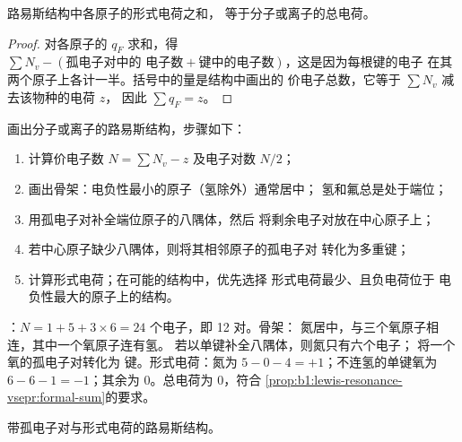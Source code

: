\begin{proposition}[形式电荷之和等于总电荷]\label{prop:b1:lewis-resonance-vsepr:formal-sum}
路易斯结构中各原子的形式电荷之和，
等于分子或离子的总电荷。
\end{proposition}

\begin{proof}
对各原子的 $q_F$ 求和，得 $\sum N_v - (\text{孤电子对中的
电子数} + \text{键中的电子数})$，这是因为每根键的电子
在其两个原子上各计一半。括号中的量是结构中画出的
价电子总数，它等于 $\sum N_v$ 减去该物种的电荷 $z$，
因此 $\sum q_F = z$。
\end{proof}

\begin{method}[画路易斯结构]\label{met:b1:lewis-resonance-vsepr:lewis}
画出分子或离子的路易斯结构，步骤如下：
\begin{enumerate}
  \item 计算价电子数 $N = \sum N_v - z$ 及电子对数 $N/2$；
  \item 画出骨架：电负性最小的原子（氢除外）通常居中；
        氢和氟总是处于端位；
  \item 用孤电子对补全端位原子的八隅体，然后
        将剩余电子对放在中心原子上；
  \item 若中心原子缺少八隅体，则将其相邻原子的孤电子对
        转化为多重键；
  \item 计算形式电荷；在可能的结构中，优先选择
        形式电荷最少、且负电荷位于
        电负性最大的原子上的结构。
\end{enumerate}
\end{method}

\begin{example}[硝酸]\label{ex:b1:lewis-resonance-vsepr:hno3}
：$N = 1 + 5 + 3 \times 6 = 24$ 个电子，即 12 对。骨架：
氮居中，与三个氧原子相连，其中一个氧原子连有氢。
若以单键补全八隅体，则氮只有六个电子；
将一个氧的孤电子对转化为  键。形式电荷：氮为
$5 - 0 - 4 = +1$；不连氢的单键氧为
$6 - 6 - 1 = -1$；其余为 0。总电荷为 0，符合
\cref{prop:b1:lewis-resonance-vsepr:formal-sum}的要求。
\end{example}

\begin{omfigure}

{\small 带孤电子对与形式电荷的路易斯结构。}
\end{omfigure}

